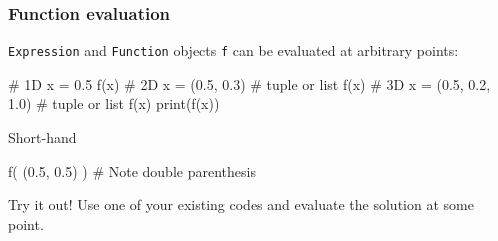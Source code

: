 \begin{frame}[fragile,shrink=10]
  \frametitle{Function evaluation}
  \texttt{Expression} and \texttt{Function} objects \texttt{f} can be
  evaluated at arbitrary points:
  \vspace{-1em}
  \begin{python}
# 1D
x = 0.5
f(x)
# 2D
x = (0.5, 0.3)  # tuple or list
f(x)
# 3D
x = (0.5, 0.2, 1.0)  # tuple or list
f(x)
print(f(x))
  \end{python}
  Short-hand
  \vspace{-1em}
  \begin{python}
   f( (0.5, 0.5) )  # Note double parenthesis
  \end{python}
 Try it out! Use one of your existing codes and
evaluate the solution at some point.
\end{frame}
